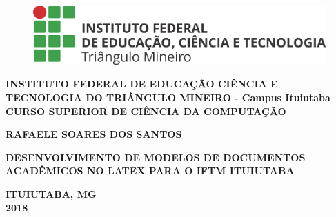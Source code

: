 \thispagestyle{empty}

\begin{figure}
	\centering
	\includegraphics[scale=0.3]{imagens/ifHorizontal.png}
\end{figure}

\begin{center}
\textbf{INSTITUTO FEDERAL DE EDUCAÇÃO CIÊNCIA E TECNOLOGIA DO TRIÂNGULO MINEIRO - Campus Ituiutaba\\CURSO SUPERIOR DE CIÊNCIA DA COMPUTAÇÃO}\\

\vspace*{2 cm}

\textbf{RAFAELE SOARES DOS SANTOS}\\

\vspace*{5 cm}

\textbf{\large{DESENVOLVIMENTO DE MODELOS DE DOCUMENTOS ACADÊMICOS NO LATEX PARA O IFTM ITUIUTABA}}

\vspace*{9 cm}

\textbf{ITUIUTABA, MG\\2018}
\end{center}